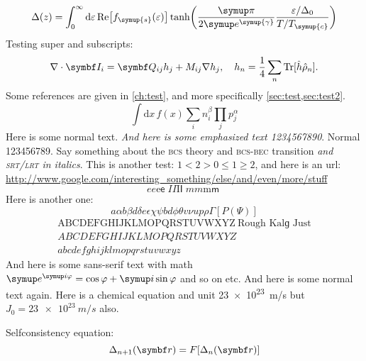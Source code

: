 \begin{equation}
  \Delta(z) = \int_0^{\infty} \mathrm{d}\epsilon\,\mathrm{Re}\big[f_{\symup{s}}(\epsilon)\big] \tanh\!\left(\frac{\symup\pi}{2\e^{\symup{\gamma}}} \frac{\epsilon/\Delta_0}{T/T_{\symup{c}}}\right)
\end{equation}
Testing super and subscripts:
\begin{equation}
  \nabla \cdot \B{I}_{i} = \B{Q}_{ij} h_j + M_{ij} \nabla h_j, \quad 
  h_n = \frac{1}{4} \sum_n \mathrm{Tr}[\hat{h}\hat{\rho}_n].
\end{equation}
Some references are given in \cref{ch:test}, and more specifically \cref{sec:test,sec:test2}.
\begin{equation}
  \int \mathrm{d}x\, f(x) \sum_i n_i^\beta \prod_j p_j^\alpha
\end{equation}
Here is some normal text. \textit{And here is some emphasized text 1234567890}. Normal 123456789. 
Say something about the \textsc{bcs} theory and \textsc{bcs-bec} transition \emph{and \textsc{srt/lrt} in italics}.
This is another test: $1 < 2 > 0 \leq 1 \geq 2$, and here is an url: \url{http://www.google.com/interesting_something/else/and/even/more/stuff}
\begin{equation}
  \textit{e}e\mathrm{e}\textsf{e}\;%
  \textit{I}I\mathrm{I}\textsf{I}\;%
  \textit{m}m\mathrm{m}\textsf{m}\;%
\end{equation}
Here is another one:
\begin{equation}
  a\alpha b\beta d\delta e\epsilon \chi\psi bd \phi\theta v\nu u p\rho \Gamma[P(\Psi)]
\end{equation}
\begin{align}
  \text{ABCDEFGHIJKLMOPQRSTUVWXYZ}~\text{Rough Kalɡ Just}\\
  ABCDEFGHIJKLMOPQRSTUVWXYZ\\
  abcdefghijklmopqrstuvwxyz
\end{align}
\textsf{And here is some sans-serif text with math $\e^{\i\phi}=\cos\phi+\i\sin\phi$ and so on etc.} And here is some normal text again.
Here is a chemical equation  and unit \SI{23e23}{m/s} but $J_0 = \SI{23e23}{m/s}$ also.

Selfconsistency equation:
\begin{equation}
  \Delta_{n+1}(\B{r}) = F[\Delta_n(\B{r})]
\end{equation}

